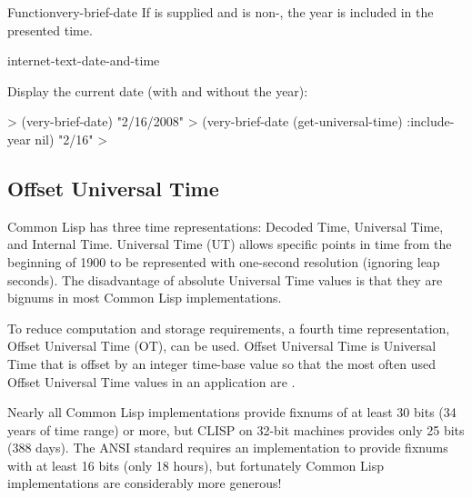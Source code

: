 \documentclass[10pt,twoside,english,pdftex]{article}
\begin{document}
\begin{functiondoc}{Function}{very-brief-date}
\W{} 
%
If  is supplied and is non-\nil, the year is included in
the presented time.

\begin{alsos}{internet-text-date-and-time}
\end{alsos}

\fnexamples
Display the current date (with and without the year):
%
\W\supp
\begin{example}
  > (very-brief-date)
  "2/16/2008"
  > (very-brief-date (get-universal-time) :include-year nil)
  "2/16"
  >
\end{example}

\end{functiondoc}


\T\markright{}%
\T\pagestyle{plain}
\T\clearpage
\W{}
\T\pagestyle{fancy}
\T\thispagestyle{fancybottom}
\T\global\def\fnlastname{ }%

\subsection{Offset Universal Time}
\label{sec:offsettime}%

%
Common Lisp has three time representations: Decoded Time, Universal
Time, and Internal Time.  Universal Time (UT) allows specific points
in time from the beginning of 1900 to be represented with one-second
resolution (ignoring leap seconds).  The disadvantage of absolute
Universal Time values is that they are bignums in most Common Lisp
implementations.

To reduce computation and storage requirements, a fourth time
representation, Offset Universal Time (OT), can be used.  Offset
Universal Time is Universal Time that is offset by an integer
time-base value so that the most often used Offset Universal Time
values in an application are .

Nearly all Common Lisp implementations provide fixnums of at least 30
bits (34 years of time range) or more, but CLISP on 32-bit machines
provides only 25 bits (388 days).  The ANSI standard requires an
implementation to provide fixnums with at least 16 bits (only 18
hours), but fortunately Common Lisp implementations are considerably more
generous!
\end{document}
